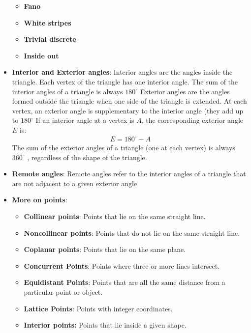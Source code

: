 \documentclass{report}
\begin{document}
\begin{itemize}
\begin{itemize}
                \item \textbf{Fano}
                \item \textbf{White stripes}
                \item \textbf{Trivial discrete}
                \item \textbf{Inside out}
            \end{itemize}
        \item \textbf{Interior and Exterior angles}: Interior angles are the angles inside the triangle. Each vertex of the triangle has one interior angle. The sum of the interior angles of a triangle is always $180^{\circ}$
            \bigbreak \noindent 
            Exterior angles are the angles formed outside the triangle when one side of the triangle is extended.
            At each vertex, an exterior angle is supplementary to the interior angle (they add up to $180^{\circ} $
            \bigbreak \noindent 
            If an interior angle at a vertex is $A$, the corresponding exterior angle $E$ is:
            \begin{align*}
                E = 180^{\circ} - A
            \end{align*}
            \bigbreak \noindent 
            The sum of the exterior angles of a triangle (one at each vertex) is always $360^{\circ}$ , regardless of the shape of the triangle.
        \item \textbf{Remote angles}: Remote angles refer to the interior angles of a triangle that are not adjacent to a given exterior angle
        \item \textbf{More on points}:
            \begin{itemize}
                \item \textbf{Collinear points}: Points that lie on the same straight line.
                \item \textbf{Noncollinear points}: Points that do not lie on the same straight line.
                \item \textbf{Coplanar points}: Points that lie on the same plane.
                \item \textbf{Concurrent Points}: Points where three or more lines intersect.
                \item \textbf{Equidistant Points}: Points that are all the same distance from a particular point or object.
                \item \textbf{Lattice Points}:  Points with integer coordinates.
                \item \textbf{Interior points:} Points that lie inside a given shape.

\end{itemize}
\end{itemize}
\end{document}
